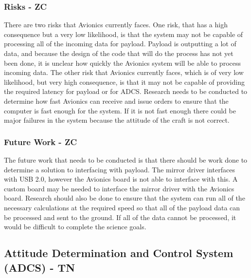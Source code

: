 \documentclass[12pt]{article}
\begin{document}
			\subsubsection{Risks - ZC}
There are two risks that Avionics currently faces. One risk, that has a high consequence but a very low likelihood, is that the system may not be capable of processing all of the incoming data for payload. Payload is outputting a lot of data, and because the design of the code that will do the process has not yet been done, it is unclear how quickly the Avionics system will be able to process incoming data. The other risk that Avionics currently faces, which is of very low likelihood, but very high consequence, is that it may not be capable of providing the required latency for payload or for ADCS. Research needs to be conducted to determine how fast Avionics can receive and issue orders to ensure that the computer is fast enough for the system. If it is not fast enough there could be major failures in the system because the attitude of the craft is not correct.

			\subsubsection{Future Work - ZC}
The future work that needs to be conducted is that there should be work done to determine a solution to interfacing with payload. The mirror driver interfaces with USB 2.0, however the Avionics board is not able to interface with this. A custom board may be needed to interface the mirror driver with the Avionics board. Research should also be done to ensure that the system can run all of the necessary calculations at the required speed so that all of the payload data can be processed and sent to the ground. If all of the data cannot be processed, it would be difficult to complete the science goals.


\newpage
\FloatBarrier

\subsection{Attitude Determination and Control System (ADCS) - TN} 
\end{document}
